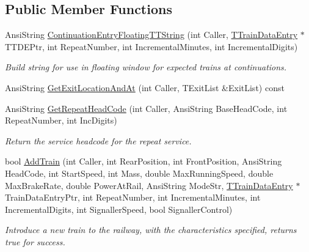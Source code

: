 \subsection*{Public Member Functions}
\begin{DoxyCompactItemize}
\item 
\mbox{\label{class_t_train_controller_a9c531d3df66921ada4e698bcf47f72f3}} 
Ansi\+String \mbox{\hyperlink{class_t_train_controller_a9c531d3df66921ada4e698bcf47f72f3}{Continuation\+Entry\+Floating\+T\+T\+String}} (int Caller, \mbox{\hyperlink{class_t_train_data_entry}{T\+Train\+Data\+Entry}} $\ast$T\+T\+D\+E\+Ptr, int Repeat\+Number, int Incremental\+Minutes, int Incremental\+Digits)
\begin{DoxyCompactList}\small\item\em Build string for use in floating window for expected trains at continuations. \end{DoxyCompactList}\item 
Ansi\+String \mbox{\hyperlink{class_t_train_controller_ae6c904f201d8bb23b3c0714226244890}{Get\+Exit\+Location\+And\+At}} (int Caller, T\+Exit\+List \&Exit\+List) const
\item 
\mbox{\label{class_t_train_controller_afb0e8fd36435809350cb323ab9fe2213}} 
Ansi\+String \mbox{\hyperlink{class_t_train_controller_afb0e8fd36435809350cb323ab9fe2213}{Get\+Repeat\+Head\+Code}} (int Caller, Ansi\+String Base\+Head\+Code, int Repeat\+Number, int Inc\+Digits)
\begin{DoxyCompactList}\small\item\em Return the service headcode for the repeat service. \end{DoxyCompactList}\item 
\mbox{\label{class_t_train_controller_ae9b32534ac7db1c3b0965fc375834132}} 
bool \mbox{\hyperlink{class_t_train_controller_ae9b32534ac7db1c3b0965fc375834132}{Add\+Train}} (int Caller, int Rear\+Position, int Front\+Position, Ansi\+String Head\+Code, int Start\+Speed, int Mass, double Max\+Running\+Speed, double Max\+Brake\+Rate, double Power\+At\+Rail, Ansi\+String Mode\+Str, \mbox{\hyperlink{class_t_train_data_entry}{T\+Train\+Data\+Entry}} $\ast$Train\+Data\+Entry\+Ptr, int Repeat\+Number, int Incremental\+Minutes, int Incremental\+Digits, int Signaller\+Speed, bool Signaller\+Control)
\begin{DoxyCompactList}\small\item\em Introduce a new train to the railway, with the characteristics specified, returns true for success. \end{DoxyCompactList}\item 

\end{DoxyCompactItemize}

